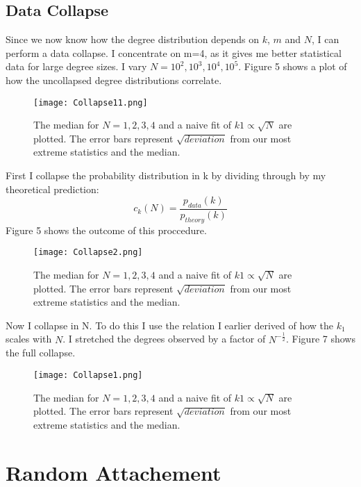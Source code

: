 \documentclass[]{article}
\begin{document}
\subsection{Data Collapse}
Since we now know how the degree distribution depends on $k$, $m$ and $N$, I can perform a data collapse. I concentrate on m=4, as it gives me better statistical data for large degree sizes. I vary $N=10^2, 10^3, 10^4, 10^5$. Figure 5 shows a plot of how the uncollapsed degree distributions correlate. 
\begin{figure}[H]
	\centering
	
	\texttt{[image: Collapse11.png]}
	\caption{The median for $N=1,2,3,4$ and a naive fit of $k1 \propto \sqrt{N}$ are plotted. The error bars represent $\sqrt{deviation}$ from our most extreme statistics and the  median.}
\end{figure} 
First I collapse the probability distribution in k by dividing through by my theoretical prediction:
\begin{equation}
	c_k(N)=\frac{p_{data}(k)}{p_{theory}(k)}
\end{equation}
Figure 5 shows the outcome of this proccedure.
\begin{figure}[H]
	\centering
	
	\texttt{[image: Collapse2.png]}
	\caption{The median for $N=1,2,3,4$ and a naive fit of $k1 \propto \sqrt{N}$ are plotted. The error bars represent $\sqrt{deviation}$ from our most extreme statistics and the  median.}
\end{figure}
Now I collapse in N. To do this I use the relation I earlier derived of how the $k_1$ scales with $N$. I stretched the degrees observed by a factor of $N^{-\frac{1}{2}}$. Figure 7 shows the full collapse.
\begin{figure}[H]
	\centering
	
	\texttt{[image: Collapse1.png]}
	\caption{The median for $N=1,2,3,4$ and a naive fit of $k1 \propto \sqrt{N}$ are plotted. The error bars represent $\sqrt{deviation}$ from our most extreme statistics and the  median.}
\end{figure}
\section{Random Attachement}
\end{document}
